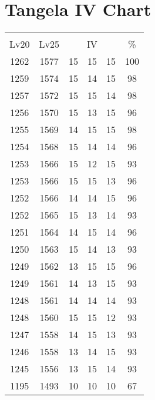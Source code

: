 \documentclass{article}%
\begin{document}
%
\normalsize%
\section{Tangela IV Chart}%
\label{sec:Tangela IV Chart}%
\renewcommand{\arraystretch}{1.5}%
\begin{tabular}{|c|c|c|c|c|c|}%
\hline%
\multicolumn{6}{|c|}{\textcolor{white}{ 
\linebreak{Tangela}
}%
\cellcolor{black}}\\%
\multicolumn{1}{|c}{Lv20}&\multicolumn{1}{c|}{Lv25}&\multicolumn{3}{c|}{IV}&\multicolumn{1}{|c|}{\%}\\%
\hline%
\rowcolor{color100}%
1262&1577&15&15&15&100\\%
\hline%
\rowcolor{color98}%
1259&1574&15&14&15&98\\%
\hline%
\rowcolor{color98}%
1257&1572&15&15&14&98\\%
\hline%
\rowcolor{color96}%
1256&1570&15&13&15&96\\%
\hline%
\rowcolor{color98}%
1255&1569&14&15&15&98\\%
\hline%
\rowcolor{color96}%
1254&1568&15&14&14&96\\%
\hline%
\rowcolor{color93}%
1253&1566&15&12&15&93\\%
\hline%
\rowcolor{color96}%
1253&1566&15&15&13&96\\%
\hline%
\rowcolor{color96}%
1252&1566&14&14&15&96\\%
\hline%
\rowcolor{color93}%
1252&1565&15&13&14&93\\%
\hline%
\rowcolor{color96}%
1251&1564&14&15&14&96\\%
\hline%
\rowcolor{color93}%
1250&1563&15&14&13&93\\%
\hline%
\rowcolor{color96}%
1249&1562&13&15&15&96\\%
\hline%
\rowcolor{color93}%
1249&1561&14&13&15&93\\%
\hline%
\rowcolor{color93}%
1248&1561&14&14&14&93\\%
\hline%
\rowcolor{color93}%
1248&1560&15&15&12&93\\%
\hline%
\rowcolor{color93}%
1247&1558&14&15&13&93\\%
\hline%
\rowcolor{color93}%
1246&1558&13&14&15&93\\%
\hline%
\rowcolor{color93}%
1245&1556&13&15&14&93\\%
\hline%
\rowcolor{color91}%
1195&1493&10&10&10&67\\%
\end{tabular}

%
\end{document}
